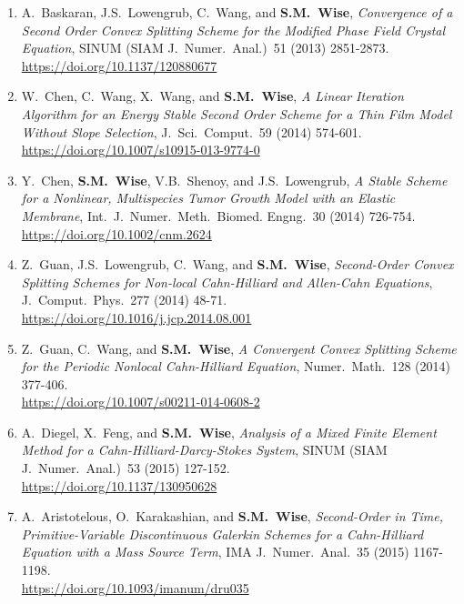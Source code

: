 \documentclass[10pt,letterpaper]{article}
\begin{document}
\begin{enumerate}
    \item
A.~Baskaran, J.S.~Lowengrub, C.~Wang, and \textbf{S.M.~Wise}, {\sl Convergence of a Second Order Convex Splitting Scheme for the Modified Phase Field Crystal Equation}, SINUM (SIAM J.~Numer.~Anal.)~51 (2013) 2851-2873.
	\\
\url{https://doi.org/10.1137/120880677}

    \item
W.~Chen, C.~Wang, X.~Wang, and \textbf{S.M.~Wise}, {\sl A Linear Iteration Algorithm for an Energy Stable Second Order Scheme for a Thin Film Model Without Slope Selection}, J.~Sci.~Comput.~59 (2014) 574-601.
	\\
\url{https://doi.org/10.1007/s10915-013-9774-0}

    \item
Y.~Chen, \textbf{S.M.~Wise}, V.B.~Shenoy, and J.S.~Lowengrub, {\sl A Stable Scheme for a Nonlinear, Multispecies Tumor Growth Model with an Elastic Membrane}, Int.~J.~Numer.~Meth.~Biomed. Engng.~30 (2014) 726-754.
	\\ 
\url{https://doi.org/10.1002/cnm.2624}

	\item
Z.~Guan, J.S.~Lowengrub, C.~Wang, and \textbf{S.M.~Wise}, {\sl Second-Order Convex Splitting Schemes for Non-local Cahn-Hilliard and Allen-Cahn Equations}, J.~Comput.~Phys.~277 (2014) 48-71.
	\\ 
\url{https://doi.org/10.1016/j.jcp.2014.08.001}

	\item
Z.~Guan, C.~Wang, and \textbf{S.M.~Wise}, {\sl A Convergent Convex Splitting Scheme for the Periodic Nonlocal Cahn-Hilliard Equation}, Numer.~Math.~128 (2014) 377-406.
	\\ 
\url{https://doi.org/10.1007/s00211-014-0608-2}

	\item
A.~Diegel, X.~Feng, and \textbf{S.M.~Wise}, {\sl Analysis of a Mixed Finite Element Method for a Cahn-Hilliard-Darcy-Stokes System}, SINUM (SIAM J.~Numer.~Anal.)~53 (2015) 127-152.
	\\ 
\url{https://doi.org/10.1137/130950628}

	\item
A.~Aristotelous, O.~Karakashian, and \textbf{S.M.~Wise}, {\sl Second-Order in Time, Primitive-Variable Discontinuous Galerkin Schemes for a Cahn-Hilliard Equation with a Mass Source Term}, IMA J.~Numer.~Anal.~35 (2015) 1167-1198.
	\\ 
\url{https://doi.org/10.1093/imanum/dru035} 


\end{enumerate}
\end{document}
